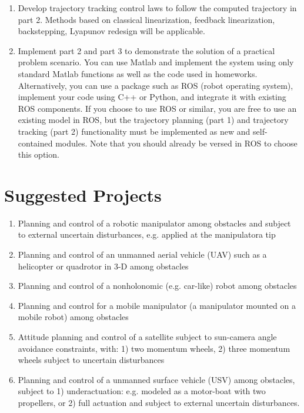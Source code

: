 \documentclass[11pt]{article}
\begin{document}
\begin{enumerate}
\item Develop trajectory tracking control laws to follow the computed trajectory in part 2. 
  Methods based on classical linearization, feedback linearization, backstepping,
  Lyapunov redesign will be applicable.
\item Implement part 2 and part 3 to demonstrate the solution of a practical
  problem scenario. You can use Matlab and implement the system using
  only standard Matlab functions as well as the code used in homeworks.
  Alternatively, you can use a package such as ROS (robot operating system), 
  implement your code using C++ or Python, and integrate it with
  existing ROS components. If you choose to use ROS or similar, you are
  free to use an existing model in ROS, but the trajectory planning (part
  1) and trajectory tracking (part 2) functionality must be implemented as
  new and self-contained modules. Note that you should already be versed
  in ROS to choose this option.
\end{enumerate}

\section{Suggested Projects}
\begin{enumerate}
\item  Planning and control of a robotic manipulator among obstacles and subject to external uncertain disturbances, e.g. applied at the manipulatora
  tip
\item Planning and control of an unmanned aerial vehicle (UAV) such as a
helicopter or quadrotor in 3-D among obstacles
\item Planning and control of a nonholonomic (e.g. car-like) robot among obstacles
\item Planning and control for a mobile manipulator (a manipulator mounted
on a mobile robot) among obstacles
\item Attitude planning and control of a satellite subject to sun-camera angle
avoidance constraints, with: 1) two momentum wheels, 2) three momentum wheels subject to uncertain disturbances
\item Planning and control of a unmanned surface vehicle (USV) among obstacles, subject to 1) underactuation: e.g. modeled as a motor-boat with two
propellers, or 2) full actuation and subject to external uncertain disturbances.
\end{enumerate}
\end{document}
